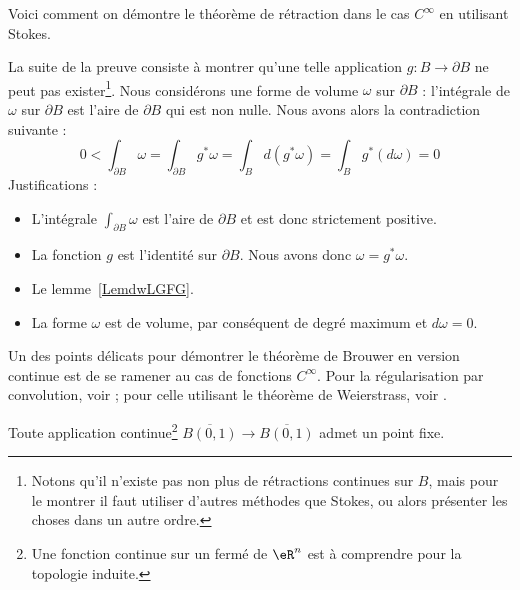 \begin{normaltext}
	Voici comment on démontre le théorème de rétraction dans le cas \( C^{\infty}\) en utilisant Stokes.


	La suite de la preuve consiste à montrer qu'une telle application \( g\colon B\to \partial B\) ne peut pas exister\footnote{Notons qu'il n'existe pas non plus de rétractions continues sur \( B\), mais pour le montrer il faut utiliser d'autres méthodes que Stokes, ou alors présenter les choses dans un autre ordre.}. Nous considérons une forme de volume \( \omega\) sur \( \partial B\) : l'intégrale de \( \omega\) sur \( \partial B\) est l'aire de \( \partial B\) qui est non nulle. Nous avons alors la contradiction suivante :
	\begin{equation}
		0<\int_{\partial B}\omega
		=\int_{\partial B}g^*\omega
		=\int_Bd(g^*\omega)
		=\int_Bg^*(d\omega)
		=0
	\end{equation}
	Justifications :
	\begin{itemize}
		\item
		      L'intégrale \( \int_{\partial B}\omega\) est l'aire de \( \partial B\) et est donc strictement positive.       %
		\item
		      La fonction \( g\) est l'identité sur \( \partial B\). Nous avons donc \( \omega=g^*\omega\).
		\item
		      Le lemme~\ref{LemdwLGFG}.			%
		\item
		      La forme \( \omega\) est de volume, par conséquent de degré maximum et \( d\omega=0\).      %
	\end{itemize}
\end{normaltext}

Un des points délicats pour démontrer le théorème de Brouwer en version continue est de se ramener au cas de fonctions \( C^{\infty}\). Pour la régularisation par convolution, voir \cite{AllardBrouwer}; pour celle utilisant le théorème de Weierstrass, voir \cite{KuttlerTopInAl}.

\begin{theorem}			\label{ThoRGjGdO}
	Toute application continue\footnote{Une fonction continue sur un fermé de \( \eR^n\) est à comprendre pour la topologie induite.} \( \overline{B(0,1)}  \to \overline{B(0,1)}\) admet un point fixe.
\end{theorem}

